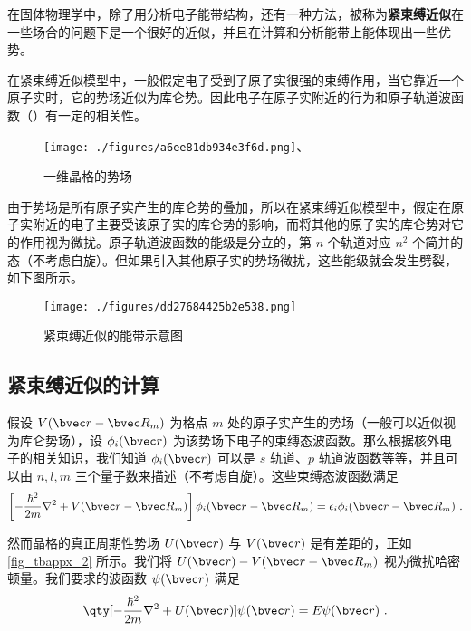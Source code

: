 

在固体物理学中，除了用分析电子能带结构，还有一种方法，被称为\textbf{紧束缚近似}在一些场合的问题下是一个很好的近似，并且在计算和分析能带上能体现出一些优势。

在紧束缚近似模型中，一般假定电子受到了原子实很强的束缚作用，当它靠近一个原子实时，它的势场近似为库仑势。因此电子在原子实附近的行为和原子轨道波函数（）有一定的相关性。
\begin{figure}[ht]
\centering
\texttt{[image: ./figures/a6ee81db934e3f6d.png]}、
\caption{一维晶格的势场} \label{fig_tbappx_2}
\end{figure}


由于势场是所有原子实产生的库仑势的叠加，所以在紧束缚近似模型中，假定在原子实附近的电子主要受该原子实的库仑势的影响，而将其他的原子实的库仑势对它的作用视为微扰。原子轨道波函数的能级是分立的，第 $n$ 个轨道对应 $n^2$ 个简并的态（不考虑自旋）。但如果引入其他原子实的势场微扰，这些能级就会发生劈裂，如下图所示。

\begin{figure}[ht]
\centering
\texttt{[image: ./figures/dd27684425b2e538.png]}
\caption{紧束缚近似的能带示意图} \label{fig_tbappx_1}
\end{figure}

\subsection{紧束缚近似的计算}

假设 $V(\bvec r-\bvec R_m)$ 为格点 $m$ 处的原子实产生的势场（一般可以近似视为库仑势场），设 $\phi_i(\bvec r)$ 为该势场下电子的束缚态波函数。那么根据核外电子的相关知识，我们知道 $\phi_i(\bvec r)$ 可以是 $s$ 轨道、$p$ 轨道波函数等等，并且可以由 $n,l,m$ 三个量子数来描述（不考虑自旋）。这些束缚态波函数满足
\begin{equation}
\left[-\frac{\hbar^2}{2m}\nabla^2+V(\bvec r-\bvec R_m)\right]\phi_i(\bvec r-\bvec R_m)=\epsilon_i\phi_i(\bvec r-\bvec R_m)~.
\end{equation}

然而晶格的真正周期性势场 $U(\bvec r)$ 与 $V(\bvec r)$ 是有差距的，正如 \autoref{fig_tbappx_2} 所示。我们将 $U(\bvec r)-V(\bvec r-\bvec R_m)$ 视为微扰哈密顿量。我们要求的波函数 $\psi(\bvec r)$ 满足
\begin{equation}\label{eq_tbappx_1}
\qty[-\frac{\hbar^2}{2m}\nabla^2+U(\bvec r)]\psi(\bvec r)=E\psi(\bvec r)~.
\end{equation}

